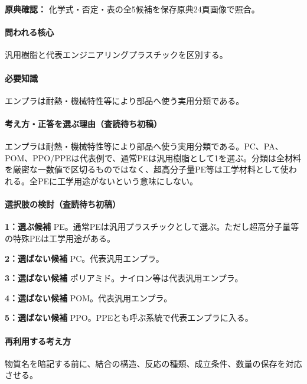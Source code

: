 \noindent\textbf{原典確認：} 化学式・否定・表の全5候補を保存原典24頁画像で照合。\par

\paragraph{問われる核心} 汎用樹脂と代表エンジニアリングプラスチックを区別する。

\paragraph{必要知識} エンプラは耐熱・機械特性等により部品へ使う実用分類である。

\paragraph{考え方・正答を選ぶ理由（査読待ち初稿）} エンプラは耐熱・機械特性等により部品へ使う実用分類である。PC、PA、POM、PPO/PPEは代表例で、通常PEは汎用樹脂として1を選ぶ。分類は全材料を厳密な一数値で区切るものではなく、超高分子量PE等は工学材料として使われる。全PEに工学用途がないという意味にしない。

\paragraph{選択肢の検討（査読待ち初稿）}\mbox{}\par

\noindent\textbf{1：選ぶ候補} PE。通常PEは汎用プラスチックとして選ぶ。ただし超高分子量等の特殊PEは工学用途がある。\par

\noindent\textbf{2：選ばない候補} PC。代表汎用エンプラ。\par

\noindent\textbf{3：選ばない候補} ポリアミド。ナイロン等は代表汎用エンプラ。\par

\noindent\textbf{4：選ばない候補} POM。代表汎用エンプラ。\par

\noindent\textbf{5：選ばない候補} PPO。PPEとも呼ぶ系統で代表エンプラに入る。\par

\paragraph{再利用する考え方} 物質名を暗記する前に、結合の構造、反応の種類、成立条件、数量の保存を対応させる。

